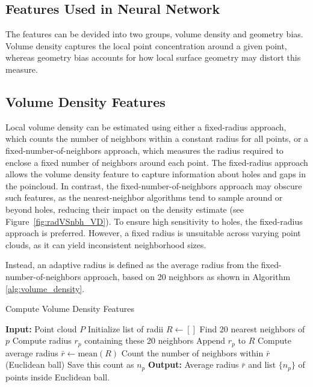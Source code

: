 \subsection{Features Used in Neural Network}
\label{sec:features}
The features can be devided into two groups, volume density and geometry bias. Volume density captures the local point concentration around a given point, whereas geometry bias accounts for how local surface geometry may distort this measure.

\subsection*{Volume Density Features}
Local volume density can be estimated using either a fixed-radius approach, which counts the number of neighbors within a constant radius for all points, or a fixed-number-of-neighbors approach, which measures the radius required to enclose a fixed number of neighbors around each point. The fixed-radius approach allows the volume density feature to capture information about holes and gaps in the poincloud. In contrast, the fixed-number-of-neighbors approach may obscure such features, as the nearest-neighbor algorithms tend to sample around or beyond holes, reducing their impact on the density estimate (see Figure~\ref{fig:radVSnbh_VD}). 
To ensure high sensitivity to holes, the fixed-radius approach is preferred. However, a fixed radius is unsuitable across varying point clouds, as it can yield inconsistent neighborhood sizes. 

Instead, an adaptive radius is defined as the average radius from the fixed-number-of-neighbors approach, based on 20 neighbors as shown in Algorithm \ref{alg:volume_density}. 
\begin{algorithm}[H]
\caption{Compute Volume Density Features}
\label{alg:volume_density}
\begin{algorithmic}[1]
\STATE \textbf{Input:} Point cloud $P$
\STATE Initialize list of radii $R \leftarrow []$
  \STATE Find 20 nearest neighbors of $p$
  \STATE Compute radius $r_p$ containing these 20 neighbors
  \STATE Append $r_p$ to $R$
\ENDFOR
\STATE Compute average radius $\bar{r} \leftarrow \text{mean}(R)$
  \STATE Count the number of neighbors within $\bar{r}$ (Euclidean ball)
  \STATE Save this count as $n_p$
\ENDFOR
\STATE \textbf{Output:} Average radius $\bar{r}$ and list $\{n_p\}$ of points inside Euclidean ball.
\end{algorithmic}
\end{algorithm}



